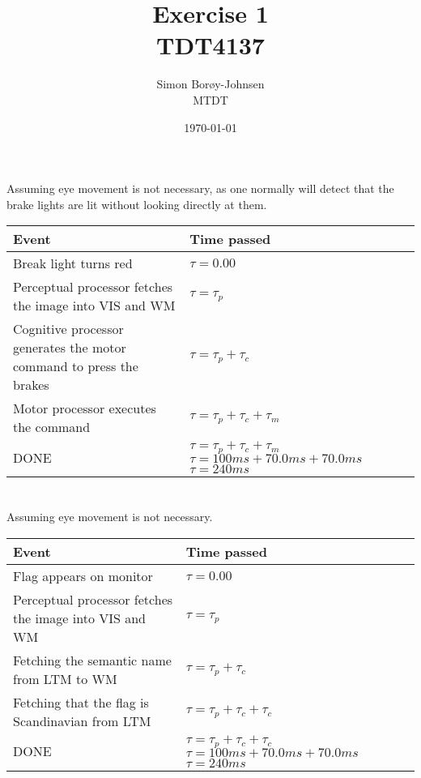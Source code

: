 \documentclass{article}
\begin{document}
\title{\textbf{Exercise 1} \\ TDT4137}
\author{Simon Borøy-Johnsen \\ MTDT}
\date{\today}
\maketitle

\section{}
Assuming eye movement is not necessary, as one normally will detect that the brake lights are lit without looking directly at them. \\

\begin{tabulary}{\textwidth}{|L|L|}
	\hline
	\textbf{Event} & \textbf{Time passed} \\\hline
	Break light turns red & $\tau=0.00$ \\\hline
	Perceptual processor fetches the image into VIS and WM & $\tau=\tau_p$ \\\hline
	Cognitive processor generates the motor command to press the brakes & $\tau=\tau_p+\tau_c$ \\\hline
	Motor processor executes the command & $\tau=\tau_p+\tau_c+\tau_m$ \\\hline
	DONE & $\tau=\tau_p+\tau_c+\tau_m$\newline$\tau=100ms+70.0ms+70.0ms$\newline$\tau=240ms$ \\\hline
\end{tabulary}

\section{}
Assuming eye movement is not necessary. \\

\begin{tabulary}{\textwidth}{|L|L|}
	\hline
	\textbf{Event} & \textbf{Time passed} \\\hline
	Flag appears on monitor & $\tau=0.00$ \\\hline
	Perceptual processor fetches the image into VIS and WM & $\tau=\tau_p$ \\\hline
	Fetching the semantic name from LTM to WM & $\tau=\tau_p+\tau_c$ \\\hline
	Fetching that the flag is Scandinavian from LTM & $\tau=\tau_p+\tau_c+\tau_c$ \\\hline
	DONE & $\tau=\tau_p+\tau_c+\tau_c$\newline$\tau=100ms+70.0ms+70.0ms$\newline$\tau=240ms$ \\\hline
\end{tabulary}
\end{document}

